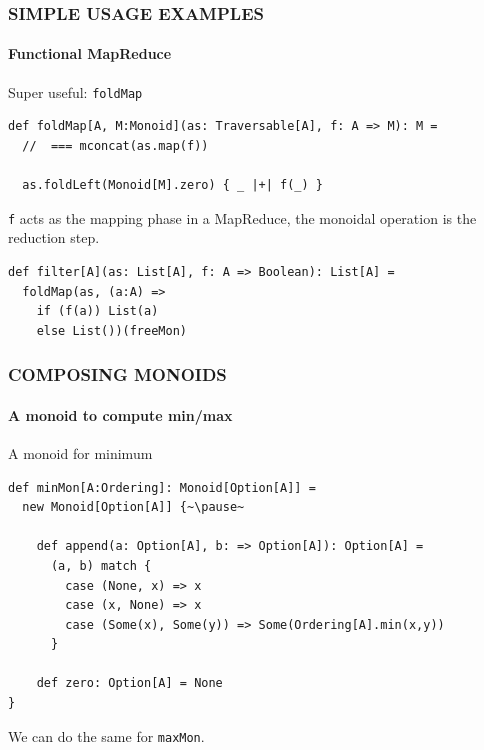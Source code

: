\documentclass{beamer}
\begin{document}
\begin{frame}[fragile] \frametitle{SIMPLE USAGE EXAMPLES}
  \framesubtitle{Functional MapReduce}
  \begin{block}{Super useful: \texttt{foldMap}}
  \begin{lstlisting}
def foldMap[A, M:Monoid](as: Traversable[A], f: A => M): M =
  //  === mconcat(as.map(f))

  as.foldLeft(Monoid[M].zero) { _ |+| f(_) }
  \end{lstlisting}
  \end{block}

  \texttt{f} acts as the mapping phase in a MapReduce, the monoidal
  operation is the reduction step.

  \begin{block}{}
  \begin{lstlisting}
def filter[A](as: List[A], f: A => Boolean): List[A] =
  foldMap(as, (a:A) =>
    if (f(a)) List(a)
    else List())(freeMon)
  \end{lstlisting}
  \end{block}
\end{frame}


\begin{frame}[fragile] \frametitle{COMPOSING MONOIDS}
  \framesubtitle{A monoid to compute min/max}
  \begin{block}{A monoid for minimum}
  \begin{lstlisting}
def minMon[A:Ordering]: Monoid[Option[A]] =
  new Monoid[Option[A]] {~\pause~

    def append(a: Option[A], b: => Option[A]): Option[A] =
      (a, b) match {
        case (None, x) => x
        case (x, None) => x
        case (Some(x), Some(y)) => Some(Ordering[A].min(x,y))
      }

    def zero: Option[A] = None
}
  \end{lstlisting}
  \end{block}
  We can do the same for \texttt{maxMon}.
\end{frame}
\end{document}

